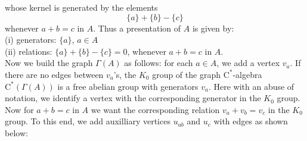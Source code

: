 \documentclass[a4paper,11pt,reqno]{amsart}
\newcommand {\edge}[2] {\draw [->] (#1) -- ($ (#1) ! .5 ! (#2) $); \draw[] ($ (#1) ! .5 ! (#2) $) -- (#2); }
\newcommand {\smallloop}[1] {\draw [->] (#1) arc (270:90:.2); \draw (#1) arc (270: 450: .2);}
\newcommand {\bigloop}[1] {\draw [->] (#1) arc (270:90:.3); \draw (#1) arc (270: 450: .3);}
\newcommand {\labelpoint} [4] {\filldraw [fill = white] (#1) node[xshift = #2pt, yshift = #3pt] {$#4$} circle (1.5pt);}
\theoremstyle{plain}
\theoremstyle{named}
\numberwithin{equation}{section}
\begin{document}
                            whose kernel is generated by the elements
                            \begin{displaymath}
                                \{a\}+\{b\}-\{c\}
                            \end{displaymath}
                            whenever $a+b=c$ in $A$. Thus a presentation of $A$ is given by:\\
                            (i) generators: $\{a\}$, $a\in A$\\
                            (ii) relations: $\{a\}+\{b\}-\{c\}=0$, whenever $a+b=c$ in $A$.\\
                            Now we build the graph $\Gamma(A)$ as follows: for each $a\in A$, we add a vertex $v_{a}$. If there are no edges between $v_{a}$'s, the $K_{0}$ group of the graph $\textrm{C}^{\ast}$-algebra $\textrm{C}^{\ast}(\Gamma(A))$ is a free abelian group with generators $v_{a}$. Here with an abuse of notation, we identify a vertex with the corresponding generator in the $K_{0}$ group. Now for $a+b=c$ in $A$ we want the corresponding relation $v_{a}+v_b=v_{c}$ in the $K_{0}$ group. To this end, we add auxilliary vertices $u_{ab}$ and $u_{c}$ with edges as shown below:
                            \begin {center}
\end {center}  
\end{document}
